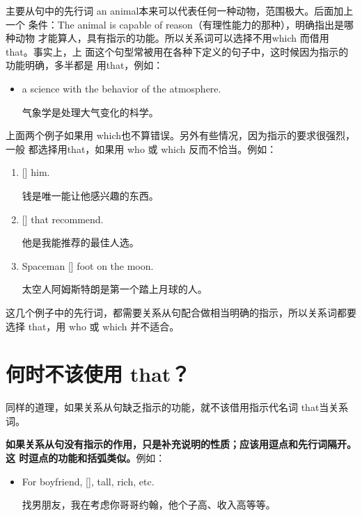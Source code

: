 主要从句中的先行词 an animal本来可以代表任何一种动物，范围极大。后面加上一个
条件：The animal is capable of reason（有理性能力的那种），明确指出是哪种动物
才能算人，具有指示的功能。所以关系词可以选择不用which 而借用that。事实上，上
面这个句型常被用在各种下定义的句子中，这时候因为指示的功能明确，多半都是
用that，例如：

\begin{itemize}
\item {}  a science 
   with the behavior of the atmosphere.

  气象学是处理大气变化的枓学。
\end{itemize}

上面两个例子如果用 which也不算错误。另外有些情况，因为指示的要求很强烈，一般
都选择用that，如果用 who 或 which 反而不恰当。例如：
\begin{enumerate}
\item {}  []
    him.

  钱是唯一能让他感兴趣的东西。
\item {} [] that
    recommend.

  他是我能推荐的最佳人选。
\item Spaceman   []
    foot on the moon.

  太空人阿姆斯特朗是第一个踏上月球的人。
\end{enumerate}

这几个例子中的先行词，都需要关系从句配合做相当明确的指示，所以关系词都要选择
that，用 who 或 which 并不适合。

\section{何时不该使用 that？}

同样的道理，如果关系从句缺乏指示的功能，就不该借用指示代名词 that当关系词。

\textbf{如果关系从句没有指示的作用，只是补充说明的性质；应该用逗点和先行词隔开。这
  时逗点的功能和括弧类似。}例如：

\begin{itemize}
\item For boyfriend,  [],   tall, rich, etc.

  找男朋友，我在考虑你哥哥约翰，他个子高、收入高等等。
\end{itemize}

